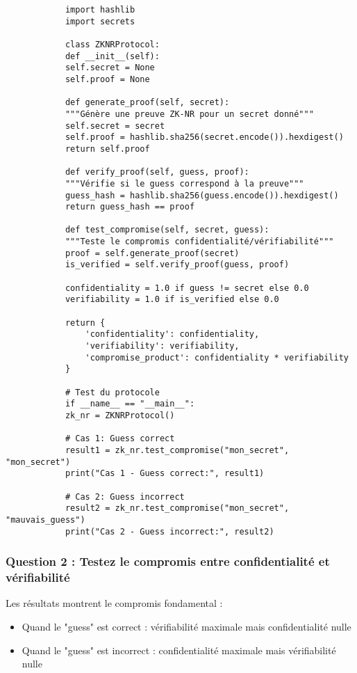 \documentclass[12pt, a4paper]{article}
\begin{document}
		\begin{verbatim}
			import hashlib
			import secrets
			
			class ZKNRProtocol:
			def __init__(self):
			self.secret = None
			self.proof = None
			
			def generate_proof(self, secret):
			"""Génère une preuve ZK-NR pour un secret donné"""
			self.secret = secret
			self.proof = hashlib.sha256(secret.encode()).hexdigest()
			return self.proof
			
			def verify_proof(self, guess, proof):
			"""Vérifie si le guess correspond à la preuve"""
			guess_hash = hashlib.sha256(guess.encode()).hexdigest()
			return guess_hash == proof
			
			def test_compromise(self, secret, guess):
			"""Teste le compromis confidentialité/vérifiabilité"""
			proof = self.generate_proof(secret)
			is_verified = self.verify_proof(guess, proof)
			
			confidentiality = 1.0 if guess != secret else 0.0
			verifiability = 1.0 if is_verified else 0.0
			
			return {
				'confidentiality': confidentiality,
				'verifiability': verifiability,
				'compromise_product': confidentiality * verifiability
			}
			
			# Test du protocole
			if __name__ == "__main__":
			zk_nr = ZKNRProtocol()
			
			# Cas 1: Guess correct
			result1 = zk_nr.test_compromise("mon_secret", "mon_secret")
			print("Cas 1 - Guess correct:", result1)
			
			# Cas 2: Guess incorrect
			result2 = zk_nr.test_compromise("mon_secret", "mauvais_guess")
			print("Cas 2 - Guess incorrect:", result2)
		\end{verbatim}
		
		\subsubsection*{Question 2 : Testez le compromis entre confidentialité et vérifiabilité}
		
		Les résultats montrent le compromis fondamental :
		\begin{itemize}
			\item Quand le "guess" est correct : vérifiabilité maximale mais confidentialité nulle
			\item Quand le "guess" est incorrect : confidentialité maximale mais vérifiabilité nulle
		\end{itemize}
		
\end{document}
